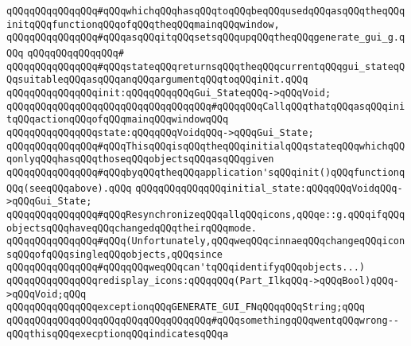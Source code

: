 \verb|qQQqqQQqqQQqqQQq#qQQqwhichqQQqhasqQQqtoqQQqbeqQQqusedqQQqasqQQqtheqQQqinitqQQqfunctionqQQqofqQQqtheqQQqmainqQQqwindow,|\newline
\verb|qQQqqQQqqQQqqQQq#qQQqasqQQqitqQQqsetsqQQqupqQQqtheqQQqgenerate_gui_g.qQQq|\newline
\verb|qQQqqQQqqQQqqQQq#|\newline
\verb|qQQqqQQqqQQqqQQq#qQQqstateqQQqreturnsqQQqtheqQQqcurrentqQQqgui_stateqQQqsuitableqQQqasqQQqanqQQqargumentqQQqtoqQQqinit.qQQq|\newline
\newline
\newline
\verb|qQQqqQQqqQQqqQQqinit:qQQqqQQqqQQqGui_StateqQQq->qQQqVoid;|\newline
\verb|qQQqqQQqqQQqqQQqqQQqqQQqqQQqqQQqqQQq#qQQqqQQqCallqQQqthatqQQqasqQQqinitqQQqactionqQQqofqQQqmainqQQqwindowqQQq|\newline
\newline
\verb|qQQqqQQqqQQqqQQqstate:qQQqqQQqVoidqQQq->qQQqGui_State;|\newline
\newline
\verb|qQQqqQQqqQQqqQQq#qQQqThisqQQqisqQQqtheqQQqinitialqQQqstateqQQqwhichqQQqonlyqQQqhasqQQqthoseqQQqobjectsqQQqasqQQqgiven|\newline
\verb|qQQqqQQqqQQqqQQq#qQQqbyqQQqtheqQQqapplication'sqQQqinit()qQQqfunctionqQQq(seeqQQqabove).qQQq|\newline
\newline
\verb|qQQqqQQqqQQqqQQqinitial_state:qQQqqQQqVoidqQQq->qQQqGui_State;|\newline
\newline
\verb|qQQqqQQqqQQqqQQq#qQQqResynchronizeqQQqallqQQqicons,qQQqe::g.qQQqifqQQqobjectsqQQqhaveqQQqchangedqQQqtheirqQQqmode.|\newline
\verb|qQQqqQQqqQQqqQQq#qQQq(Unfortunately,qQQqweqQQqcinnaeqQQqchangeqQQqiconsqQQqofqQQqsingleqQQqobjects,qQQqsince|\newline
\verb|qQQqqQQqqQQqqQQq#qQQqqQQqweqQQqcan'tqQQqidentifyqQQqobjects...)|\newline
\newline
\verb|qQQqqQQqqQQqqQQqredisplay_icons:qQQqqQQq(Part_IlkqQQq->qQQqBool)qQQq->qQQqVoid;qQQq|\newline
\newline
\verb|qQQqqQQqqQQqqQQqexceptionqQQqGENERATE_GUI_FNqQQqqQQqString;qQQq|\newline
\verb|qQQqqQQqqQQqqQQqqQQqqQQqqQQqqQQqqQQq#qQQqsomethingqQQqwentqQQqwrong--qQQqthisqQQqexecptionqQQqindicatesqQQqa|\newline
